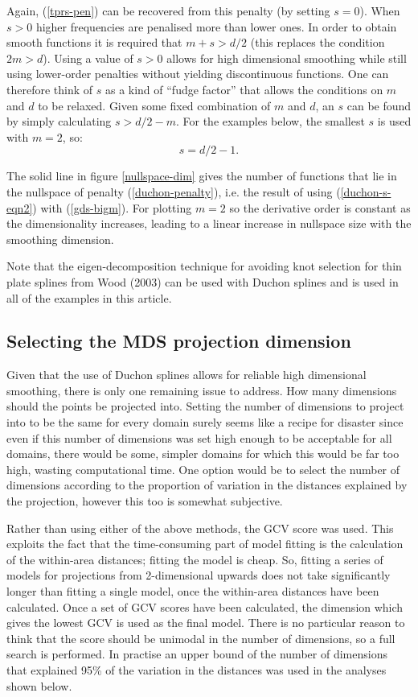 \documentclass[useAMS,referee]{biom}
\begin{document}
Again, (\ref{tprs-pen}) can be recovered from this penalty (by setting $s=0$). When $s>0$ higher frequencies are penalised more than lower ones. In order to obtain smooth functions it is required that $m+s>d/2$ (this replaces the condition $2m>d$). Using a value of $s>0$ allows for high dimensional smoothing while still using lower-order penalties without yielding discontinuous functions. One can therefore think of $s$ as a kind of ``fudge factor'' that allows the conditions on $m$ and $d$ to be relaxed. Given some fixed combination of $m$ and $d$, an $s$ can be found by simply calculating $s>d/2-m$. For the examples below, the smallest $s$ is used with $m=2$, so:
\begin{equation}
s=d/2-1.
\label{duchon-s-eqn2}
\end{equation}

The solid line in figure \ref{nullspace-dim} gives the number of functions that lie in the nullspace of penalty (\ref{duchon-penalty}), i.e. the result of using (\ref{duchon-s-eqn2}) with (\ref{gds-bigm}). For plotting $m=2$ so the derivative order is constant as the dimensionality increases, leading to a linear increase in nullspace size with the smoothing dimension.

Note that the eigen-decomposition technique for avoiding knot selection for thin plate splines from Wood (2003) can be used with Duchon splines and is used in all of the examples in this article.

\subsection{Selecting the MDS projection dimension}

Given that the use of Duchon splines allows for reliable high dimensional smoothing, there is only one remaining issue to address. How many dimensions should the points be projected into. Setting the number of dimensions to project into to be the same for every domain surely seems like a recipe for disaster since even if this number of dimensions was set high enough to be acceptable for all domains, there would be some, simpler domains for which this would be far too high, wasting computational time. One option would be to select the number of dimensions according to the proportion of variation in the distances explained by the projection, however this too is somewhat subjective.

Rather than using either of the above methods, the GCV score was used. This exploits the fact that the time-consuming part of model fitting is the calculation of the within-area distances; fitting the model is cheap. So, fitting a series of models for projections from 2-dimensional upwards does not take significantly longer than fitting a single model, once the within-area distances have been calculated. Once a set of GCV scores have been calculated, the dimension which gives the lowest GCV is used as the final model. There is no particular reason to think that the score should be unimodal in the number of dimensions, so a full search is performed. In practise an upper bound of the number of dimensions that explained 95\% of the variation in the distances was used in the analyses shown below.
\end{document}
